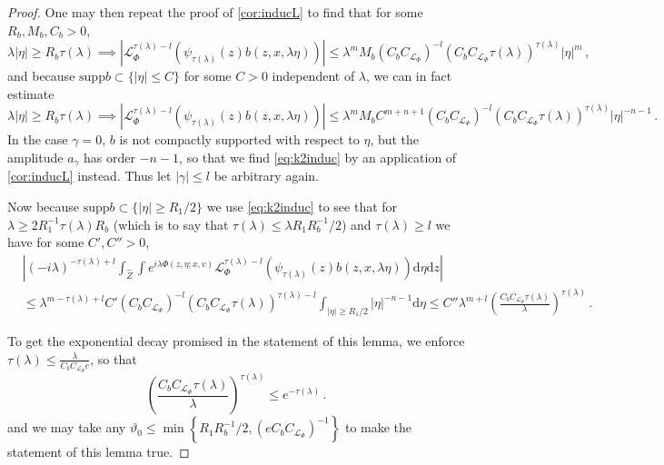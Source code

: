 \documentclass[
	fontsize=11pt, 
	twoside=false, 
	abstract=true, 
	a4paper,
]{scrartcl}
\newcommand{\dd}{\mathrm{d}}
\newcommand{\abs}[1]{\left\lvert#1\right\rvert}
\newcommand{\supp}{\mathrm{supp}}
\begin{document}
\begin{proof}
	One may then repeat the proof of \cref{cor:inducL} to find that for some $R_b, M_b, C_b>0$,
%
\begin{equation*}%
	\lambda\abs{\eta} \geq R_b\tau(\lambda)\implies\abs{\mathcal{L}_\Phi^{\tau(\lambda)-l}\left(\psi_{\tau(\lambda)}(z)b(z,x,\lambda\eta)\right)} \leq \lambda^{m} M_b (C_bC_{\mathcal{L}_\Phi})^{-l} (C_b C_{\mathcal{L}_\Phi}\tau(\lambda))^{\tau(\lambda)} \abs{\eta}^{m}\,,
	\end{equation*}
	and because $\supp b \subset \{\abs{\eta} \leq C\}$ for some $C>0$ independent of $\lambda$, we can in fact estimate
	\begin{equation}\label{eq:k2induc}
	\lambda\abs{\eta} \geq R_b\tau(\lambda)\implies\abs{\mathcal{L}_\Phi^{\tau(\lambda)-l}\left(\psi_{\tau(\lambda)}(z)b(z,x,\lambda\eta)\right)} \leq \lambda^{m} M_b C^{m+n+1}(C_bC_{\mathcal{L}_\Phi})^{-l} (C_b C_{\mathcal{L}_\Phi}\tau(\lambda))^{\tau(\lambda)} \abs{\eta}^{-n-1}\,.
	\end{equation}
	In the case $\gamma = 0$, $b$ is not compactly supported with respect to $\eta$, but the amplitude $a_\gamma$ has order $-n-1$, so that we find \cref{eq:k2induc} by an application of \cref{cor:inducL} instead. Thus let $\abs{\gamma} \leq l$ be arbitrary again. 

	Now because $\supp b \subset \{\abs{\eta} \geq R_1/2\}$ we use \cref{eq:k2induc} to see that for $\lambda \geq 2R_1^{-1}\tau(\lambda)R_b$ (which is to say that $\tau(\lambda) \leq \lambda R_1 R_b^{-1}/2$) and $\tau(\lambda)\geq l$ we have for some $C',C''>0$,
\begin{align*}
	&{}\abs{ (-i\lambda)^{-\tau(\lambda)+l} \int_{\hat Z}\int e^{i\lambda\Phi(z,\eta;x,v)} \mathcal{L}_\Phi^{\tau(\lambda)-l}\left(\psi_{\tau(\lambda)}(z)b(z,x,\lambda\eta)\right)\dd\eta \dd z} \\
	&\leq \lambda^{m-\tau(\lambda)+l} C' (C_b C_{\mathcal{L}_\Phi})^{-l} (C_b C_{\mathcal{L}_\Phi}\tau(\lambda))^{\tau(\lambda)-l}\int_{\abs{\eta} \geq R_1/2} \abs{\eta}^{-n-1} \dd\eta \leq C'' \lambda^{m+l} \left(\frac{C_b C_{\mathcal{L}_\Phi}\tau(\lambda)}{\lambda}\right)^{\tau(\lambda)}\,.
\end{align*}

	To get the exponential decay promised in the statement of this lemma, we enforce $\tau(\lambda) \leq \frac{\lambda}{C_bC_{\mathcal{L}_\Phi}e}$, so that 
\[
	\left(\frac{C_b C_{\mathcal{L}_\Phi}\tau(\lambda)}{\lambda}\right)^{\tau(\lambda)} \leq e^{-\tau(\lambda)}\,.
\]
	and we may take any $\vartheta_0 \leq \min\left\{R_1R_b^{-1}/2, (eC_bC_{\mathcal{L}_\Phi})^{-1}\right\}$ to make the statement of this lemma true. %
\end{proof}
\end{document}
